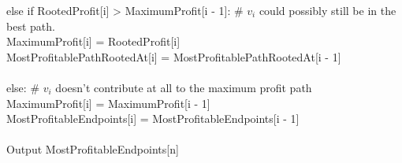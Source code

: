 \documentclass[letterpaper,notitlepage,twoside]{article}
\newcommand\tab[1][1cm]{\hspace*{#1}} %
\begin{document}
\tab else if RootedProfit[i] > MaximumProfit[i - 1]: \# $v_i$ could possibly still be in the best path.\\
\tab\tab MaximumProfit[i] = RootedProfit[i]\\
\tab\tab MostProfitablePathRootedAt[i] = MostProfitablePathRootedAt[i - 1]\\
\\
\tab else: \# $v_i$ doesn't contribute at all to the maximum profit path\\
\tab\tab MaximumProfit[i] = MaximumProfit[i - 1]\\
\tab\tab MostProfitableEndpoints[i] = MostProfitableEndpoints[i - 1]\\
\\
Output MostProfitableEndpoints[n]
\end{document}
